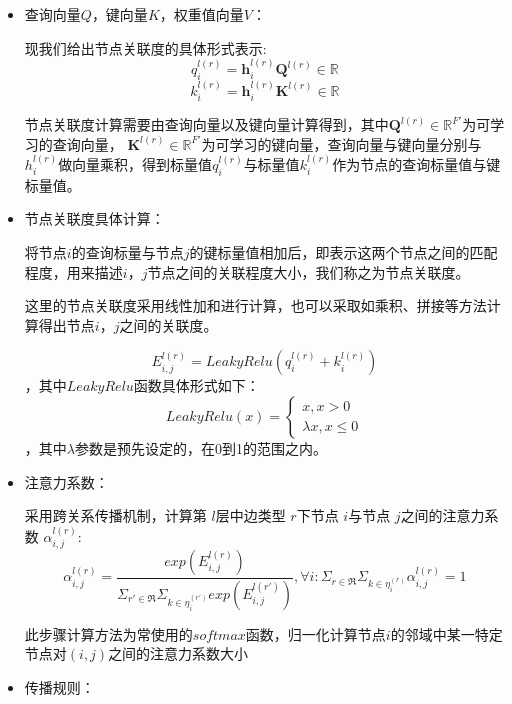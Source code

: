 \documentclass{ctexart}
\begin{document}
\begin{itemize}
    \item 查询向量$Q$，键向量$K$，权重值向量$V$：
    
    现我们给出节点关联度的具体形式表示:
    \begin{equation}
        q_i^{l(r)}=\mathbf{h}^{l(r)}_i\mathbf{Q}^{l(r)}\in\mathbb{R}
    \end{equation}
    \begin{equation}
        k_i^{l(r)}=\mathbf{h}^{l(r)}_i\mathbf{K}^{l(r)}\in\mathbb{R}
    \end{equation}

    

节点关联度计算需要由查询向量以及键向量计算得到，其中$\mathbf{Q}^{l(r)}\in\mathbb{R}^{F'}$为可学习的查询向量， $\mathbf{K}^{l(r)}\in\mathbb{R}^{F'}$为可学习的键向量，查询向量与键向量分别与$h_i^{l(r)}$做向量乘积，得到标量值$q_i^{l(r)}$与标量值$k_i^{l(r)}$作为节点的查询标量值与键标量值。

    \item 节点关联度具体计算：
    
    将节点$i$的查询标量与节点$j$的键标量值相加后，即表示这两个节点之间的匹配程度，用来描述$i$，$j$节点之间的关联程度大小，我们称之为节点关联度。

这里的节点关联度采用线性加和进行计算，也可以采取如乘积、拼接等方法计算得出节点$i$，$j$之间的关联度。

\begin{equation}
    E_{i,j}^{l(r)} = LeakyRelu(q_i^{l(r)}+k_i^{l(r)})
\end{equation}
，其中$LeakyRelu$函数具体形式如下：
\begin{equation}
    LeakyRelu(x)=\begin{cases}x,x>0\\\lambda x,x\leq 0\end{cases}
\end{equation}
，其中$\lambda$参数是预先设定的，在0到1的范围之内。
    \item 注意力系数： 
    
    采用跨关系传播机制，计算第 $l$层中边类型 $r$下节点 $i$与节点  $j$之间的注意力系数 $\alpha_{i,j}^{l(r)}$:
    \begin{equation}
        \alpha_{i,j}^{l(r)}=\frac{exp(E_{i,j}^{l(r)})}{\Sigma_{r'\in\mathfrak{R}}\Sigma_{k\in{\eta_{i}^{(r')}}}exp(E_{i,j}^{l(r')})},\forall i:\Sigma_{r\in\mathfrak{R}}\Sigma_{k\in{\eta_{i}^{(r)}}}\alpha_{i,j}^{l(r)}=1
    \end{equation}

    此步骤计算方法为常使用的$softmax$函数，归一化计算节点$i$的邻域中某一特定节点对$(i,j)$之间的注意力系数大小
    \item 传播规则：
    

\end{itemize}
\end{document}

